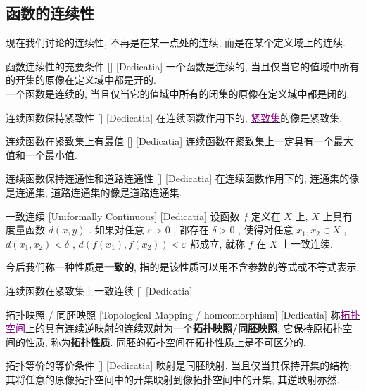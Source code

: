 \documentclass[UTF8]{ctexart}
\newcommand{\hyperrefc}[2]{\hyperref[#1]{\textcolor{purple}{#2}}}
\begin{document}
\subsection{函数的连续性}
现在我们讨论的连续性, 不再是在某一点处的连续, 而是在某个定义域上的连续. 
\begin{thm}
    [UUID]
    {函数连续性的充要条件}
    []
    [Dedicatia]
    一个函数是连续的, 当且仅当它的值域中所有的开集的原像在定义域中都是开的. \\
    一个函数是连续的, 当且仅当它的值域中所有的闭集的原像在定义域中都是闭的. 
\end{thm}
\begin{thm}
    [UUID]
    {连续函数保持紧致性}
    []
    [Dedicatia]
    在连续函数作用下的, \hyperrefc{dfn:Compactness}{紧致集}的像是紧致集. 
\end{thm}
\begin{crl}
    [UUID]
    {连续函数在紧致集上有最值}
    []
    [Dedicatia]
    连续函数在紧致集上一定具有一个最大值和一个最小值. 
\end{crl}
\begin{thm}
    [UUID]
    {连续函数保持连通性和道路连通性}
    []
    [Dedicatia]
    在连续函数作用下的, 连通集的像是连通集, 道路连通集的像是道路连通集.
\end{thm}
\begin{dfn}
    [UUID]
    {一致连续}
    [Uniformally Continuous]
    [Dedicatia]
    设函数 \( f \) 定义在 \( X \) 上,  \( X \) 上具有度量函数 \( d(x,y) \) . 如果对任意 \( \varepsilon>0 \) , 都存在 \( \delta>0 \) , 使得对任意 \( x_1,x_2\in X \) ,  \( d(x_1,x_2)<\delta \) ,  \( d(f(x_1),f(x_2))<\varepsilon \) 都成立, 就称 \( f \) 在 \( X \) 上一致连续. 
\end{dfn}
今后我们称一种性质是\textbf{一致的}, 指的是该性质可以用不含参数的等式或不等式表示. 
\begin{thm}
    [UUID]
    {连续函数在紧致集上一致连续}
    []
    [Dedicatia]
\end{thm}
\begin{dfn}
    [UUID]
    {拓扑映照 / 同胚映照}
    [Topological Mapping / homeomorphism]
    [Dedicatia]
    称\hyperrefc{dfn:TopologicalSpace}{拓扑空间}上的具有连续逆映射的连续双射为一个\textbf{拓扑映照/同胚映照}, 它保持原拓扑空间的性质, 称为\textbf{拓扑性质}. 同胚的拓扑空间在拓扑性质上是不可区分的. 
\end{dfn}
\begin{crl}
    [UUID]
    {拓扑等价的等价条件}
    []
    [Dedicatia]
    映射是同胚映射, 当且仅当其保持开集的结构: 其将任意的原像拓扑空间中的开集映射到像拓扑空间中的开集, 其逆映射亦然. 
\end{crl}
\end{document}
